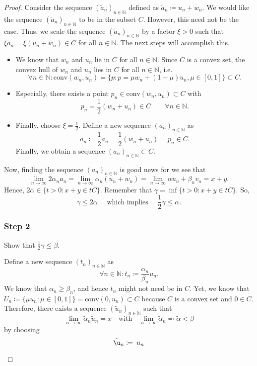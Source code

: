 \documentclass[a4paper]{article}
\begin{document}
\begin{enumerate}[label=(\roman*)]
\begin{proof}
		Consider the sequence $(\tilde a_n)_{n \in \mathbb N}$ defined as $\tilde a_n \coloneqq u_n + w_n$. We would like the sequence $(\tilde a_n)_{n \in \mathbb N}$ to be in the subset $C$. However, this need not be the case. Thus, we scale the sequence $(\tilde a_n)_{n \in \mathbb N}$  by a factor $\xi > 0$ such that $\xi a_n = \xi (u_n + w_n) \in C$ for all $n \in \mathbb N$.  The next steps will accomplish this.
		
		 \begin{itemize}
		 	\item We know that $w_n$ and $u_n$ lie in $C$ for all $n \in \mathbb N$. Since $C$ is a convex set, the convex hull of $w_n$ and $u_n$ lies in $C$ for all $n \in \mathbb N$, i.e.
		 	\[
		 		\forall n \in \mathbb N: \mathrm{conv}({w_n,u_n}) = \{ p : p = \mu w_n + (1-\mu)u_n, \mu \in [0,1] \} \subset C.
		 	\]
		 	
		 	\item Especially, there exists a point $p_n \in \mathrm{conv}(w_n,u_n) \subset C$ with $$p_n = \frac{1}{2}(w_n +
		 	 u_n) \in C \qquad \forall n \in \mathbb N.$$
		 	
		 	\item Finally, choose $\xi = \frac{1}{2}$. Define a new sequence $(a_n)_{n \in \mathbb N}$ as 
		 	\[
		 		a_n \coloneqq \frac{1}{2}\tilde a_n =   \frac{1}{2}(w_n + u_n) = p_n \in C.
		 	\]
		 	Finally, we obtain a sequence $(a_n)_{n \in \mathbb N} \subset C$.
		 \end{itemize}
        
        Now, finding the sequence $(a_n)_{n \in \mathbb N}$ is good news for we see that
        \[
            \lim_{n \to \infty} 2\alpha_n a_n = \lim_{n \to \infty} \alpha_n (u_n +w_n) = \lim_{n \to \infty} \alpha u_n + \beta_n v_n = x + y.
        \]
        Hence, $2\alpha \in \{ t > 0 : x+y \in t C \}$. Remember that $\gamma = \inf \{ t > 0 : x+y \in t C \}$. So,
        \[
        	\gamma \leq 2\alpha \quad \text{ which implies } \quad \frac{1}{2}\gamma \leq \alpha.
        \]
        
        \subsubsection*{Step 2}    
		
		\begin{goal}{}{}
		Show that $\frac{1}{2}\gamma \leq \beta$.
		\end{goal}
       
       Define a new sequence $(t_n)_{n \in \mathbb N}$ as
        \[
            \forall n \in \mathbb N: t_n \coloneqq \frac{\alpha_n}{\beta_n}u_n.
        \]
		We know that $\alpha_n \geq \beta_n$, and hence $t_n$ might not need be in $C$. Yet, we know that $U_n \coloneqq \{ \mu u_n : \mu \in [0,1] \} = \mathrm{conv}(0,u_n) \subset C$ because $C$ is a convex set and $0 \in C$. Therefore, there exists a sequence $(\tilde u_n)_{n \in \mathbb N}$ such that 
\[
	\lim_{n \to \infty} \tilde \alpha_n \tilde u_n = x \quad \text{with} \quad \lim_{n \to \infty} \tilde \alpha_n \eqqcolon \tilde \alpha < \beta
\]		
by choosing
\[
	\tilde \u_n \coloneqq \frac{}{}u_n
\]


\end{proof}
\end{enumerate}
\end{document}
